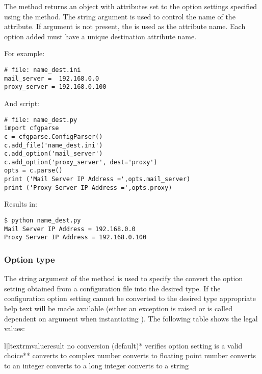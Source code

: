 \documentclass{howto}
\begin{document}
The  method returns an object with attributes set to the option
settings specified using the  method.  The  string
argument is used to control the name of the attribute.  If  argument
is not present, the  is used as the attribute name.  Each option
added must have a unique destination attribute name.

For example:

\begin{verbatim}
# file: name_dest.ini
mail_server =  192.168.0.0
proxy_server = 192.168.0.100
\end{verbatim}

And script:

\begin{verbatim}
# file: name_dest.py
import cfgparse
c = cfgparse.ConfigParser()
c.add_file('name_dest.ini')
c.add_option('mail_server')
c.add_option('proxy_server', dest='proxy')
opts = c.parse()
print ('Mail Server IP Address =',opts.mail_server)
print ('Proxy Server IP Address =',opts.proxy)
\end{verbatim}

Results in:

\begin{verbatim}
$ python name_dest.py
Mail Server IP Address = 192.168.0.0
Proxy Server IP Address = 192.168.0.100
\end{verbatim}
 
\subsubsection{Option type\label{cfgparse-option-type}}

The  string argument of the  method is used to specify
the convert the option setting obtained from a configuration file into the 
desired type.  If the configuration option setting cannot be converted to the
desired type appropriate help text will be made available (either an exception 
is raised or  is called dependent on  argument
when instantiating ).  The following table shows the legal values:

\begin{tableii}{l|l}{textrm}{value}{result}
      {no conversion (default)*}
  {verifies option setting is a valid choice**}
 {converts to complex number}
   {converts to floating point number}
     {converts to an integer}
    {converts to a long integer}
  {converts to a string}
\end{tableii}
\end{document}
